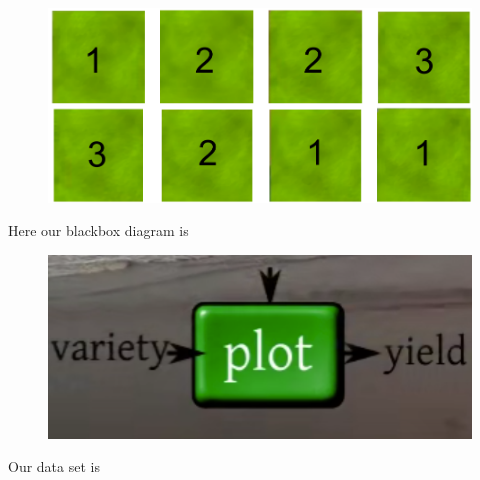 \documentclass[11pt, a4paper]{article}\usepackage[]{graphicx}\usepackage[]{xcolor}
\begin{document}
\begin{figure}[H]
  \centering
  \includegraphics[scale = 0.45]{allocation} \\
\end{figure}


Here our blackbox diagram is
\begin{figure}[H]
  \centering
  \includegraphics[scale = 0.5]{blackbox} \\
\end{figure}


\newpage


Our data set is
\end{document}
